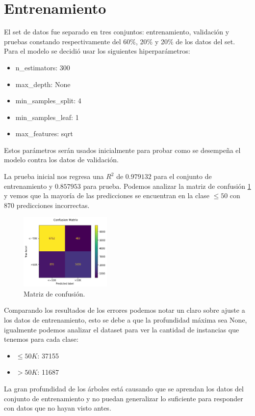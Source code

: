 \documentclass[twocolumn]{article}
\begin{document}
\section{Entrenamiento}
El set de datos fue separado en tres conjuntos: entrenamiento, validación y pruebas
constando respectivamente del 60\%, 20\% y 20\% de los datos del set. Para el modelo
se decidió usar los siguientes hiperparámetros:
\begin{itemize}
  \item n\_estimators: 300
  \item max\_depth: None
  \item min\_samples\_split: 4
  \item min\_samples\_leaf: 1
  \item max\_features: sqrt
\end{itemize}
Estos parámetros serán usados inicialmente para probar como se desempeña el modelo 
contra los datos de validación.

La prueba inicial nos regresa una $R^2$ de $0.979132$ para el conjunto de entrenamiento
y $0.857953$ para prueba. Podemos analizar la matriz de confusión \ref{fig:conf1}
y vemos que la mayoría de las predicciones se encuentran en la clase 
$\leq50$ con 870 predicciones incorrectas. 

\begin{figure}[!ht]
\centering
\includegraphics[width=0.4\textwidth]{assets/conf1.png}
\caption{Matriz de confusión.}
\label{fig:conf1}
\end{figure}

Comparando los resultados de los errores podemos notar un claro sobre ajuste a los
datos de entrenamiento, esto se debe a que la profundidad máxima sea None, igualmente 
podemos analizar el dataset para ver la cantidad de instancias que tenemos para cada clase:
\begin{itemize}
  \item $\leq50K$: 37155
  \item $>50K$: 11687
\end{itemize}
La gran profundidad de los árboles está causando que se aprendan los datos del
conjunto de entrenamiento y no puedan generalizar lo suficiente para responder
con datos que no hayan visto antes. 
\end{document}
